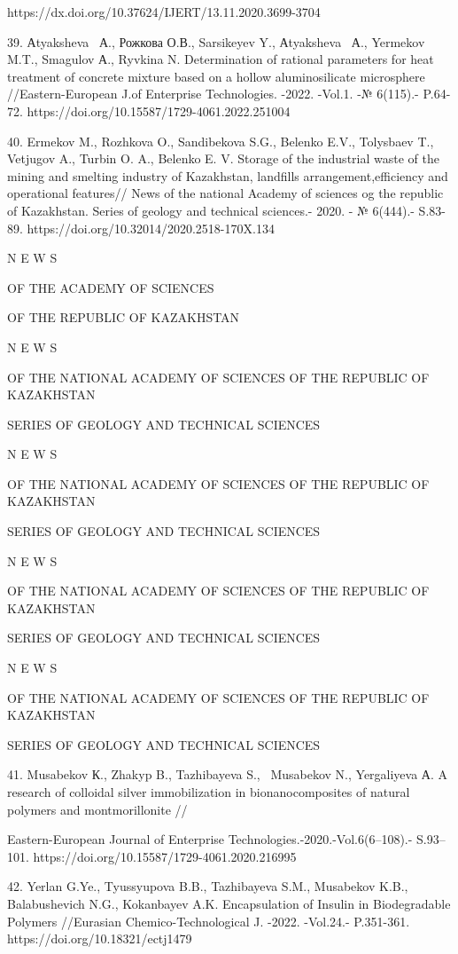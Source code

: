 https://dx.doi.org/10.37624/IJERT/13.11.2020.3699-3704

39. Аtyaksheva~ А., Рожкова О.В., Sarsikeyev Y., Аtyaksheva~ А.,
Yermekov M.T., Smagulov А., Ryvkina N. Determination of rational
parameters for heat treatment of concrete mixture based on a hollow
aluminosilicate microsphere //Eastern-European J.of Enterprise
Technologies. -2022. -Vol.1. -№ 6(115).- P.64-72.
https://doi.org/10.15587/1729-4061.2022.251004

40. Ermekov M., Rozhkova O., Sandibekova S.G., Belenko E.V., Tolysbaev
T., Vetjugov A., Turbin O. A., Belenko E. V. Storage of the industrial
waste of the mining and smelting industry of Kazakhstan, landfills
arrangement,efficiency and operational features// News of the national
Academy of sciences og the republic of Kazakhstan. Series of geology and
technical sciences.- 2020. - № 6(444).- S.83-89.
https://doi.org/10.32014/2020.2518-170X.134

N E W S

OF THE ACADEMY OF SCIENCES

OF THE REPUBLIC OF KAZAKHSTAN

N E W S

OF THE NATIONAL ACADEMY OF SCIENCES OF THE REPUBLIC OF KAZAKHSTAN

SERIES OF GEOLOGY AND TECHNICAL SCIENCES

N E W S

OF THE NATIONAL ACADEMY OF SCIENCES OF THE REPUBLIC OF KAZAKHSTAN

SERIES OF GEOLOGY AND TECHNICAL SCIENCES

N E W S

OF THE NATIONAL ACADEMY OF SCIENCES OF THE REPUBLIC OF KAZAKHSTAN

SERIES OF GEOLOGY AND TECHNICAL SCIENCES

N E W S

OF THE NATIONAL ACADEMY OF SCIENCES OF THE REPUBLIC OF KAZAKHSTAN

SERIES OF GEOLOGY AND TECHNICAL SCIENCES

41. Musabekov К., Zhakyp B., Tazhibayeva S., ~Musabekov N., Yergaliyeva
А. A research of colloidal silver immobilization in bionanocomposites of
natural polymers and montmorillonite //

Eastern-European Journal of Enterprise
Technologies.-2020.-Vol.6(6--108).- S.93--101.
https://doi.org/10.15587/1729-4061.2020.216995

42. Yerlan G.Ye., Tyussyupova B.B., Tazhibayeva S.M., Musabekov K.B.,
Balabushevich N.G., Kokanbayev A.K. Encapsulation of Insulin in
Biodegradable Polymers //Eurasian Chemico-Technological J. -2022.
-Vol.24.- P.351-361. https://doi.org/10.18321/ectj1479

